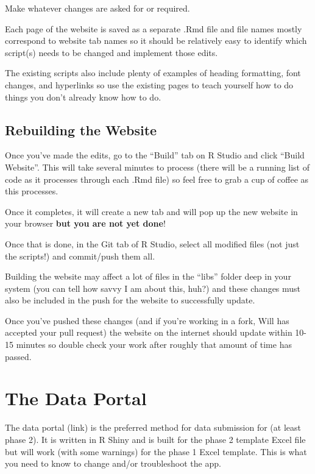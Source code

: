 \documentclass[
  letterpaper,
  DIV=11,
  numbers=noendperiod]{scrreprt}
\begin{document}
Make whatever changes are asked for or required.

Each page of the website is saved as a separate .Rmd file and file names
mostly correspond to website tab names so it should be relatively easy
to identify which script(s) needs to be changed and implement those
edits.

The existing scripts also include plenty of examples of heading
formatting, font changes, and hyperlinks so use the existing pages to
teach yourself how to do things you don't already know how to do.

\section{Rebuilding the Website}\label{rebuilding-the-website}

Once you've made the edits, go to the ``Build'' tab on R Studio and
click ``Build Website''. This will take several minutes to process
(there will be a running list of code as it processes through each .Rmd
file) so feel free to grab a cup of coffee as this processes.

Once it completes, it will create a new tab and will pop up the new
website in your browser \textbf{but you are not yet done}!

Once that is done, in the Git tab of R Studio, select all modified files
(not just the scripts!) and commit/push them all.

Building the website may affect a lot of files in the ``libs'' folder
deep in your system (you can tell how savvy I am about this, huh?) and
these changes must also be included in the push for the website to
successfully update.

Once you've pushed these changes (and if you're working in a fork, Will
has accepted your pull request) the website on the internet should
update within 10-15 minutes so double check your work after roughly that
amount of time has passed.

\chapter{The Data Portal}\label{the-data-portal}

The data portal (link) is the preferred method for data submission for
(at least phase 2). It is written in R Shiny and is built for the phase
2 template Excel file but will work (with some warnings) for the phase 1
Excel template. This is what you need to know to change and/or
troubleshoot the app.
\end{document}
